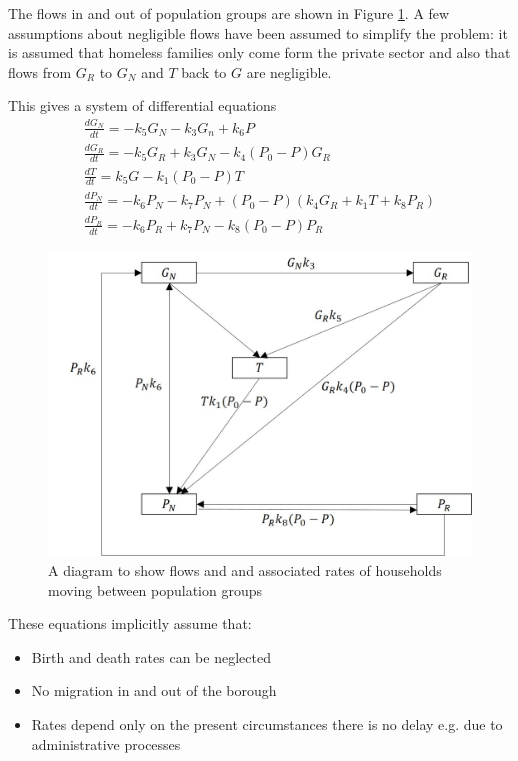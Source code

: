 \documentclass[11pt]{article} %
\begin{document}
The flows in and out of population groups are shown in Figure \ref{fig:homelessrates}. A few assumptions about negligible flows have been assumed to simplify the problem: it is assumed that homeless families only come form the private sector and also that flows from $ G_R $ to $ G_N $ and $ T $ back to $ G $ are negligible. 

This gives a system of differential equations
\begin{eqnarray}
\frac{dG_N}{dt}=-k_5 G_N-k_3 G_n +k_6 P\\
\frac{dG_R}{dt}=-k_5 G_R +k_3 G_N -k_4 (P_0-P)G_R\\
\frac{dT}{dt}=k_5 G -k_1(P_0 -P)T\\
\frac{dP_N}{dt}=-k_6 P_N -k_7 P_N +(P_0-P)(k_4 G_R +k_1 T+k_8 P_R)\\
\frac{dP_R}{dt}=-k_6 P_R+k_7 P_N -k_8(P_0-P)P_R
\end{eqnarray}
	 \begin{figure}
	 	\centering
	 	\includegraphics[width=0.9\linewidth]{Report_images/homeless_rates}
	 	
	 	\caption{A diagram to show  flows and and associated rates of households moving  between population groups}
	 	\label{fig:homelessrates}
	 \end{figure}
	 
	These equations implicitly assume that:  
	\begin{itemize}
		\item Birth and death rates can be neglected
		\item No migration in and out of the borough 
		\item Rates depend only on the present circumstances there is no delay e.g. due to administrative processes 
	\end{itemize}
\end{document}
